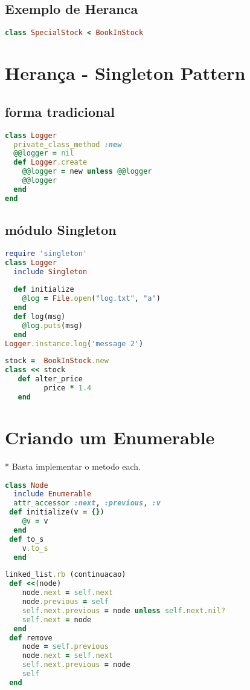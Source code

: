 \documentclass[serif,mathserif]{book}
\begin{document}
\subsection{Exemplo de Heranca}
\begin{lstlisting}[language=ruby]
class SpecialStock < BookInStock
\end{lstlisting}

\section{Herança - Singleton Pattern}

\subsection{forma tradicional}
\begin{lstlisting}[language=ruby]
class Logger
  private_class_method :new
  @@logger = nil
  def Logger.create
    @@logger = new unless @@logger
    @@logger
  end
end
\end{lstlisting}

\subsection{módulo Singleton}
\begin{lstlisting}[language=ruby]
require 'singleton'
class Logger
  include Singleton
  
  def initialize
    @log = File.open("log.txt", "a")
  end
  def log(msg)
    @log.puts(msg)
  end
Logger.instance.log('message 2')
\end{lstlisting}

\begin{lstlisting}[language=ruby]
stock =  BookInStock.new
class << stock
   def alter_price
         price * 1.4
   end
\end{lstlisting}

\section{Criando um Enumerable}
  *  Basta implementar o metodo each. 
\begin{lstlisting}[language=ruby]
class Node
  include Enumerable 
  attr_accessor :next, :previous, :v
 def initialize(v = {})
    @v = v
  end
 def to_s
    v.to_s
  end
\end{lstlisting}

\begin{lstlisting}[language=ruby]
linked_list.rb (continuacao)
 def <<(node)
    node.next = self.next
    node.previous = self
    self.next.previous = node unless self.next.nil?
    self.next = node
  end
 def remove
    node = self.previous
    node.next = self.next
    self.next.previous = node
    self
 end
\end{lstlisting}
\end{document}
